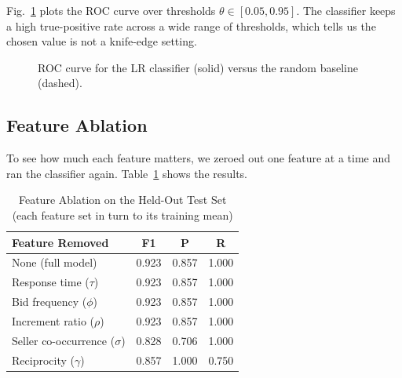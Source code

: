 \documentclass[conference]{IEEEtran}
\begin{document}
Fig.~\ref{fig:roc} plots the ROC curve over thresholds
$\theta \in [0.05, 0.95]$. The classifier keeps a high true-positive rate
across a wide range of thresholds, which tells us the chosen value is not
a knife-edge setting.

\begin{figure}[h]
\centering
{}
\caption{ROC curve for the LR classifier (solid) versus the random
  baseline (dashed).}
\label{fig:roc}
\end{figure}

\subsection{Feature Ablation}

To see how much each feature matters, we zeroed out one feature at a time
and ran the classifier again. Table~\ref{tab:ablation} shows the results.

\begin{table}[h]
\centering
\begin{tabular}{lccc}
\toprule
\textbf{Feature Removed} & \textbf{F1} & \textbf{P} & \textbf{R} \\
\midrule
None (full model)         & 0.923 & 0.857 & 1.000       \\
Response time ($\tau$)    & 0.923 & 0.857 & 1.000       \\
Bid frequency ($\phi$)    & 0.923 & 0.857 & 1.000       \\
Increment ratio ($\rho$)  & 0.923 & 0.857 & 1.000       \\
Seller co-occurrence ($\sigma$) & 0.828 & 0.706 & 1.000 \\
Reciprocity ($\gamma$)    & 0.857 & 1.000 & 0.750       \\
\bottomrule
\end{tabular}
\vspace{8pt}
\caption{Feature Ablation on the Held-Out Test Set (each feature set in
turn to its training mean)}
\label{tab:ablation}
\end{table}
\end{document}
